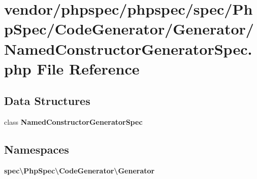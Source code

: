 \section{vendor/phpspec/phpspec/spec/\+Php\+Spec/\+Code\+Generator/\+Generator/\+Named\+Constructor\+Generator\+Spec.php File Reference}
\label{_named_constructor_generator_spec_8php}
\subsection*{Data Structures}
\begin{DoxyCompactItemize}
\item 
class {\bf Named\+Constructor\+Generator\+Spec}
\end{DoxyCompactItemize}
\subsection*{Namespaces}
\begin{DoxyCompactItemize}
\item 
 {\bf spec\textbackslash{}\+Php\+Spec\textbackslash{}\+Code\+Generator\textbackslash{}\+Generator}
\end{DoxyCompactItemize}

